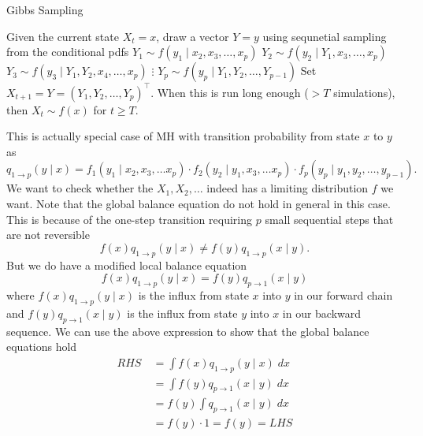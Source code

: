     {\centering
        \begin{minipage}{.85\linewidth}
            \begin{algorithm}[H]
                \caption{Gibbs Sampling}
                \label{alg: gibb_samp}
                \SetAlgoLined
                \DontPrintSemicolon

                \BlankLine
                Given the current state $X_t = x$, draw a vector $Y=y$ using sequnetial sampling from the conditional pdfs\;
                $Y_1 \sim f(y_1 \mid x_2 , x_3 , \ldots , x_p)$\;
                $Y_2 \sim f(y_2 \mid Y_1, x_3 , \ldots , x_p)$\;
                $Y_3 \sim f(y_3 \mid Y_1, Y_2, x_4 , \ldots , x_p)$\;
                $\vdots$\;
                $Y_p \sim f(y_p \mid Y_1, Y_2, \ldots , Y_{p-1})$\;
                Set $X_{t+1} = Y = \left( Y_1 , Y_2 , \ldots , Y_p \right)^{\intercal}$.\;
                When this is run long enough ($> T$ simulations), then $X_t \sim f(x)$ for $t \geq T$.
                \BlankLine
            \end{algorithm}
        \end{minipage}
        \par
    }

This is actually special case of MH with transition probability from state $x$ to $y$ as
\[
    q_{1 \to p} (y \mid x) = f_1(y_1 \mid x_2,x_3, \ldots x_p) \cdot f_2(y_2 \mid y_1,x_3, \ldots x_p) \cdot f_p (y_p \mid y_1,y_2, \ldots ,y_{p-1}).
\]
We want to check whether the $X_1 , X_2 , \ldots $ indeed has a limiting distribution $f$ we want. Note that the global balance equation do not hold in general in this case. This is because of the one-step transition requiring $p$ small sequential steps that are not reversible
\[
    f(x) q_{1 \to p} (y \mid x) \neq f(y) q_{1 \to p} (x \mid y).
\]
But we do have a modified local balance equation
\[
    f(x) q_{1 \to p} (y \mid x) = f(y) q_{p \to 1} (x \mid y)
\]
where $f(x) q_{1 \to p} (y \mid x)$ is the influx from state $x$ into $y$ in our forward chain and $f(y) q_{p \to 1} (x \mid y)$ is the influx from state $y$ into $x$ in our backward sequence. We can use the above expression to show that the global balance equations hold
\begin{align*}
    RHS \
     & = \int f(x) q_{1 \to p} (y \mid x) \; dx \\
     & = \int f(y) q_{p \to 1} (x \mid y) \; dx \\
     & = f(y) \int q_{p \to 1} (x \mid y) \; dx \\
     & = f(y) \cdot 1 = f(y) = LHS
\end{align*}

